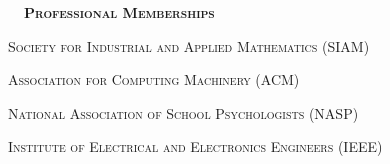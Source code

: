 \documentclass[hidelinks, 10.5pt]{article}
\def\contentwidth{0.9\linewidth}    %
\def\sectionspacing{8mm}            %
\def\sectiontocontentspacing{4mm}   %
\renewcommand{\section}[1]{
    {\fontsize{14}{14}\selectfont \textsc{\textbf{\ \ #1\ \ }}}\hrulefill
}
\begin{document}
{\vspace{\sectionspacing}


\section{Professional Memberships}

\vspace{\sectiontocontentspacing}

\begin{minipage}[ct]{\contentwidth}
    \textsc{Society for Industrial and Applied Mathematics} (SIAM)
\end{minipage}

\vspace{0.5mm}

\begin{minipage}[ct]{\contentwidth}
    \textsc{Association for Computing Machinery} (ACM)
\end{minipage}

\vspace{0.5mm}

\begin{minipage}[ct]{\contentwidth}
    \textsc{National Association of School Psychologists} (NASP)
\end{minipage}

\vspace{0.5mm}

\begin{minipage}[ct]{\contentwidth}
    \textsc{Institute of Electrical and Electronics Engineers} (IEEE)
\end{minipage}

\vspace{-2mm}



}
\end{document}

